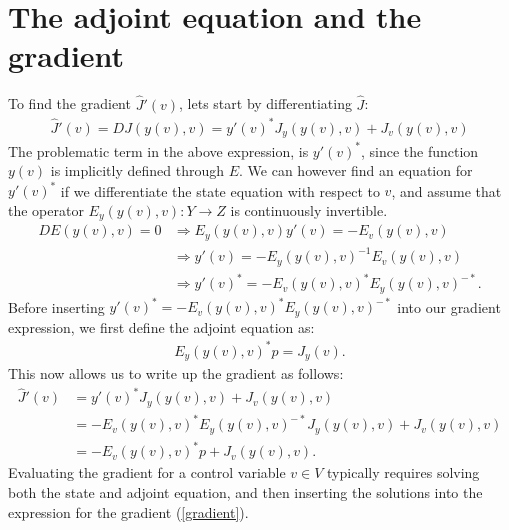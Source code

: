 \section{The adjoint equation and the gradient}
To find the gradient $\hat{J}'(v)$, lets start by differentiating $\hat J$:
\begin{align*}
\hat{J}'(v) = DJ(y(v),v) = y'(v)^*J_y(y(v),v) + J_v(y(v),v)
\end{align*}
The problematic term in the above expression, is $y'(v)^*$, since the function $y(v)$ is implicitly defined through $E$. We can however find an equation for $y'(v)^*$ if we differentiate the state equation with respect to $v$, and assume that the operator $E_y(y(v),v):Y\rightarrow Z$ is continuously invertible.
\begin{align*}
DE(y(v),v)=0 &\Rightarrow E_y(y(v),v)y'(v)=-E_v(y(v),v) \\ &\Rightarrow y'(v)=-E_y(y(v),v)^{-1}E_v(y(v),v) \\ &\Rightarrow y'(v)^* = -E_v(y(v),v)^*E_y(y(v),v)^{-*}.
\end{align*}
Before inserting $y'(v)^* = -E_v(y(v),v)^*E_y(y(v),v)^{-*}$ into our gradient expression, we first define the adjoint equation as:
\begin{align}
E_y(y(v),v)^{*}p=J_y(v). \label{general adjoint}
\end{align}
This now allows us to write up the gradient as follows:
\begin{align}
\hat{J}'(v)&= y'(v)^*J_y(y(v),v) + J_v(y(v),v)\\
&=-E_v(y(v),v)^*E_y(y(v),v)^{-*}J_y(y(v),v) + J_v(y(v),v) \\
&= -E_v(y(v),v)^*p +J_v(y(v),v). \label{gradient}
\end{align}
Evaluating the gradient for a control variable $v\in V$ typically requires solving both the state and adjoint equation, and then inserting the solutions into the expression for the gradient (\ref{gradient}).

